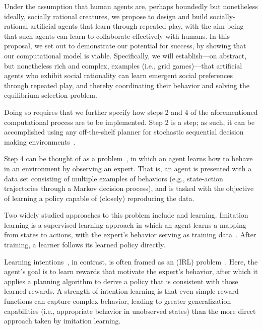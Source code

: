 Under the assumption that human agents are, perhaps boundedly but
nonetheless ideally, socially rational creatures, we propose to design
and build socially-rational artificial agents that learn through
repeated play, with the aim being that such agents can learn to
collaborate effectively with humans.
%
In this proposal, we set out to demonstrate our potential for success,
by showing that our computational model is viable.  Specifically, we
will establish---on abstract, but nonetheless rich and complex,
examples (i.e., grid games)---that artificial agents who exhibit
social rationality can learn emergent social preferences through
repeated play, and thereby coordinating their behavior and solving
the equilibrium selection problem.

Doing so requires that we further specify how steps 2 and 4 of the
aforementioned computational process are to be implemented.  Step 2 is
a  step; as such, it can be accomplished using any
off-the-shelf planner for stochastic sequential decision making
environments~\cite{Barto95,bellman57,boutilier99,collins95,kearns99b,kocsis06}.

Step 4 can be thought of as a 
problem~\cite{argall09}, in which an agent learns how to behave in an
environment by observing an expert.  That is, an agent is presented
with a data set consisting of multiple examples of behaviors (e.g.,
state-action trajectories through a Markov decision process), and is
tasked with the objective of learning a policy capable of (closely)
reproducing the data.

Two widely studied approaches to this problem include
 and  learning.  Imitation learning
is a supervised learning approach in which an agent learns a mapping
from states to actions, with the expert's behavior serving as training
data~\cite{pomerleau93}.  After training, a learner follows its
learned policy directly.

Learning intentions~\cite{macglashan15b}, in contrast, is often framed
as an  (IRL)
problem~\cite{babes11,ng00}.  Here, the agent's goal is to learn
rewards that motivate the expert's behavior, after which it applies a
planning algorithm to derive a policy that is consistent with those
learned rewards.  A strength of intention learning is that even simple
reward functions can capture complex behavior, leading to greater
generalization capabilities (i.e., appropriate behavior in unobserved
states) than the more direct approach taken by imitation learning.

